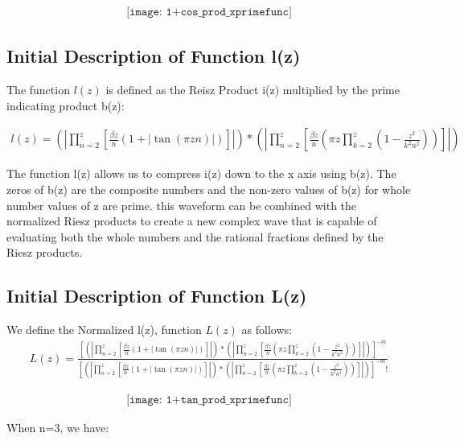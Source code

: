 \documentclass{article}
\begin{document}
\begin{align*}
\texttt{[image: 1+cos\_prod\_xprimefunc]}
\end{align*}

\subsection*{Initial Description of Function l(z)}
The function $l(z)$ is defined as the Reisz Product i(z) multiplied by the prime indicating product b(z):

\begin{align*}
	l(z) = \left(|\prod_{n=2}^z\left[\frac{\beta z}{n}\left(1 + |\tan\left(\pi z n\right)|\right)\right]|\right)*\left(|\prod_{n=2}^z\left[\frac{\beta z}{n}\left({\pi z}\prod_{k=2}^z\left(1 - \frac{z^2}{k^2n^2}\right)\right)\right]|\right)
\end{align*} 

The function l(z) allows us to compress i(z) down to the x axis using b(z). The zeros of b(z) are the composite numbers and the non-zero values of b(z) for whole number values of z are prime. this waveform can be combined with the normalized Riesz products to create a new complex wave that is capable of evaluating both the whole numbers and the rational fractions defined by the Riesz products.

\subsection*{Initial Description of Function L(z)}
We define the Normalized l(z), function $L(z)$ as follows:
\begin{align*}
	L(z) = \frac{\left[\left(|\prod_{n=2}^z\left[\frac{\beta z}{n}\left(1 + |\tan\left(\pi z n\right)|\right)\right]|\right)*\left(|\prod_{n=2}^z\left[\frac{\beta z}{n}\left({\pi z}\prod_{k=2}^z\left(1 - \frac{z^2}{k^2n^2}\right)\right)\right]|\right)\right]^{-m}}{\left[\left(|\prod_{n=2}^z\left[\frac{\beta z}{n}\left(1 + |\tan\left(\pi z n\right)|\right)\right]|\right)*\left(|\prod_{n=2}^z\left[\frac{\beta z}{n}\left({\pi z}\prod_{k=2}^z\left(1 - \frac{z^2}{k^2n^2}\right)\right)\right]|\right)\right]^{-m}!}
\end{align*}

\begin{align*}
\texttt{[image: 1+tan\_prod\_xprimefunc]}
\end{align*}

When n=3, we have: \\
\end{document}
